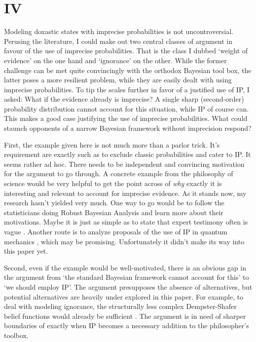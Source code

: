 \documentclass[11pt, a4paper]{scrartcl}
\begin{document}
\section{IV}

Modeling doxastic states with imprecise probabilities is not uncontroversial. Perusing the literature, I could make out two central classes of argument in favour of the use of imprecise probabilities. That is the class I dubbed `weight of evidence' on the one hand and `ignorance' on the other. While the former challenge can be met quite convincingly with the orthodox Bayesian tool box, the latter poses a more resilient problem, while they are easily dealt with using imprecise probabilities. To tip the scales further in favor of a justified use of IP, I asked: What if the evidence already is imprecise? A single sharp (second-order) probability distribution cannot account for this situation, while IP of course can. This makes a good case justifying the use of imprecise probabilities. What could staunch opponents of a narrow Bayesian framework without imprecision respond? 

First, the example given here is not much more than a parlor trick. It's requirement are exactly such as to exclude classic probabilities and cater to IP. It seems rather ad hoc. There needs to be independent and convincing motivation for the argument to go through. A concrete example from the philosophy of science would be very helpful to get the point across of \emph{why} exactly it is interesting and relevant to account for imprecise evidence. As it stands now, my research hasn't yielded very much. One way to go would be to follow the statisticians doing Robust Bayesian Analysis \citep{Berger1994} and learn more about their motivations. Maybe it is just as simple as to state that expert testimony often is vague \citep{Destercke2014}. Another route is to analyze proposals of the use of IP in quantum mechanics \citep{pittphilsci4734}, which may be promising. Unfortunately it didn't make its way into this paper yet.

Second, even if the example would be well-motivated, there is an obvious gap in the argument from `the standard Bayesian framework cannot account for this' to `we should employ IP'. The argument presupposes the absence of alternatives, but potential alternatives are heavily under explored in this paper. For example, to deal with modeling ignorance, the structurally less complex Dempster-Shafer belief functions would already be sufficient \citep{Shafer1976-SHAAMT, Norton2011-NORCTB}. The argument is in need of sharper boundaries of exactly when IP becomes a necessary addition to the philosopher's toolbox.
\end{document}
